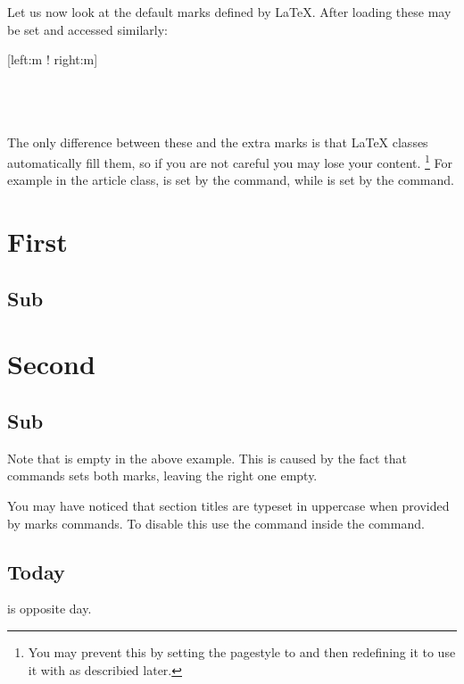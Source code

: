 Let us now look at the default marks defined by \LaTeX{}. After loading
 these may be set and accessed similarly:
\begin{lscommand}
  [left:m ! right:m] \\
   \\
   \\
   \\
\end{lscommand}
The only difference between these and the extra marks is that \LaTeX{} classes
automatically fill them, so if you are not careful you may lose your content.
\footnote{You may prevent this by setting the pagestyle to 
  and then redefining it to use it with  as describied later.}
For example in the article class,  is set by the 
command, while  is set by the  command.
\begin{example}[standalone, paperheight=5cm]
\geometry{includehead, includefoot, headsep=.5em, footskip=1em} %
\sloppy %
\usepackage{fancyhdr}%
\usepackage{extramarks}%
\pagestyle{fancy}%
\fancyhead[L]{\firstleftmark}
\fancyhead[R]{\lastleftmark}
\fancyfoot[L]{\firstrightmark}
\fancyfoot[R]{\lastrightmark}

\section{First}
\subsection{Sub}
\section{Second}
\subsection{Sub}
\end{example}
Note that  is empty in the above example. This is caused by
the fact that  commands sets both marks, leaving the right one
empty.

You may have noticed that section titles are typeset in uppercase when provided by
marks commands. To disable this use the  command inside the 
command.
\begin{example}[standalone, paperheight=3cm]
\geometry{includehead, includefoot, headsep=.5em, footskip=1em} %
\sloppy %
\usepackage{fancyhdr}%
\usepackage{extramarks}%
\pagestyle{fancy}%
\fancyhead[R]{\nouppercase{\firstleftmark}}

\section{Today}
is opposite day.
\end{example}

